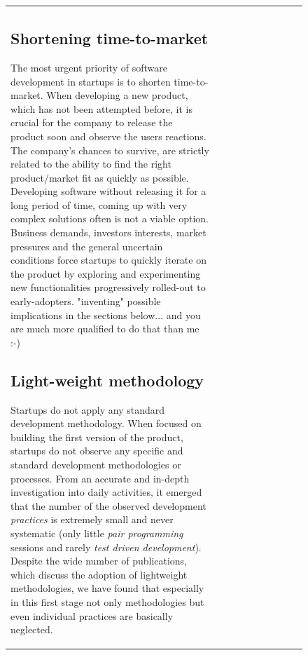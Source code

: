 \documentclass[12pt,journal,compsoc]{../sty/IEEEtran}
\begin{document}
\begin{table}[!t]
\begin{figure}[!t]
\begin{compactitem}
\begin{table}[!t]
\begin{tabular}{|l||c||c||c||c||c||c||c||c||c|}
\subsection{Shortening time-to-market}

The most urgent priority of software development in startups is to shorten
time-to-market. When developing a new product, which has not been attempted
before, it is crucial for the company to release the product soon and observe
the users reactions. The company's chances to survive, are strictly related to
the ability to find the right product/market fit as quickly as possible.
Developing software without releasing it for a long period of time, coming up
with very complex solutions often is not a viable option. Business demands,
investors interests, market pressures and the general uncertain conditions force
startups to quickly iterate on the product by exploring and experimenting new
functionalities progressively rolled-out to early-adopters. %
"inventing" possible implications in the sections below...  %
and you are much more qualified to do that than me :-)



\subsection{Light-weight methodology} Startups do not apply any standard
development methodology. When focused  on building the first version of the
product, startups do not observe any  specific and standard development
methodologies or processes.  From an accurate  and in-depth investigation into
daily activities, it emerged that the number of   the observed development
\textit{practices} is extremely small and never  systematic (only little
\textit{pair programming} sessions and rarely  \textit{test driven
development}). Despite the wide number of publications,  which discuss the
adoption of lightweight methodologies, we have found that  especially in this
first stage not only methodologies but even individual  practices are basically
neglected.


\end{tabular}
\end{table}
\end{compactitem}
\end{figure}
\end{table}
\end{document}
